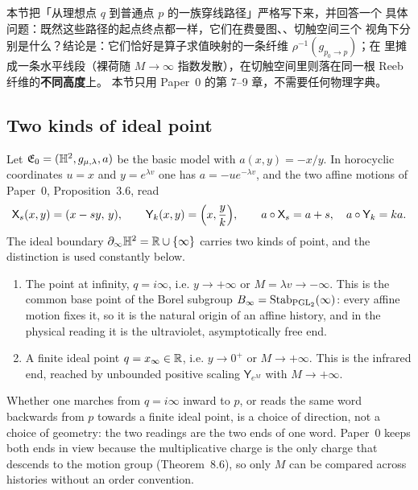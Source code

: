 
\begin{cnread}
本节把「从理想点 $q$ 到普通点 $p$ 的一族穿线路径」严格写下来，并回答一个
具体问题：既然这些路径的起点终点都一样，它们在费曼图、\ACS{}、切触空间三个
视角下分别是什么？结论是：它们恰好是算子求值映射的一条纤维
$\rho^{-1}(g_{p_0\to p})$；在 \ACS{} 里摊成一条水平线段（裸荷随 $M\to\infty$
指数发散），在切触空间里则落在同一根 Reeb 纤维的\textbf{不同高度}上。
本节只用 Paper~0 的第 7--9 章，不需要任何物理字典。
\end{cnread}

\subsection{Two kinds of ideal point}

Let $\mathfrak{E}_0=(\mathbb{H}^2,g_{\mu,\lambda},a)$ be the basic model with
$a(x,y)=-x/y$.  In horocyclic coordinates $u=x$ and $y=e^{\lambda v}$ one has
$a=-ue^{-\lambda v}$, and the two affine motions of Paper~0,
Proposition~3.6, read
\begin{equation}\label{eq:grid-motions}
  \mathsf X_s(x,y)=(x-sy,\,y),
  \qquad
  \mathsf Y_k(x,y)=\Bigl(x,\frac yk\Bigr),
  \qquad
  a\circ\mathsf X_s=a+s,\quad a\circ\mathsf Y_k=ka .
\end{equation}
The ideal boundary $\partial_\infty\mathbb{H}^2=\mathbb{R}\cup\{\infty\}$ carries two kinds of point,
and the distinction is used constantly below.

\begin{enumerate}[label=(\roman*)]
  \item The point at infinity, $q=i\infty$, i.e. $y\to+\infty$ or
  $M=\lambda v\to-\infty$.  This is the common base point of the
  Borel subgroup $B_\infty=\operatorname{Stab}_{\operatorname{PGL}_2}(\infty)$: every affine motion fixes
  it, so it is the natural origin of an affine history, and in the physical
  reading it is the ultraviolet, asymptotically free end.
  \item A finite ideal point $q=x_\infty\in\mathbb{R}$, i.e. $y\to0^{+}$ or
  $M\to+\infty$.  This is the infrared end, reached by unbounded positive
  scaling $\mathsf Y_{e^{M}}$ with $M\to+\infty$.
\end{enumerate}

\begin{remark}
Whether one marches from $q=i\infty$ inward to $p$, or reads the same word
backwards from $p$ towards a finite ideal point, is a choice of direction, not a
choice of geometry: the two readings are the two ends of one word.  Paper~0
keeps both ends in view because the multiplicative charge is the only charge
that descends to the motion group (Theorem~8.6), so only $M$ can be compared
across histories without an order convention.
\end{remark}

